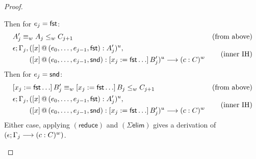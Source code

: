 \documentclass[twoside]{report}
\begin{document}
\begin{proof}
\begin{itemize}
\begin{itemize}
                        Then for $e_j = \operatorname{\mathsf{fst}}$:
                        $$
                            \begin{aligned}
                                                                                                                                                                 & A_j' \equiv_w A_j \leq_w C_{j+1} & \text{(from above)} \\
                                                                                                                                                                 &
                                \begin{aligned}
                                    \epsilon; \Gamma_j,\, & ({[x]}\,@\,({e_0, \ldots, e_{j-1}, \operatorname{\mathsf{fst}}}) : A_j')^u,                                              \\
                                                          & ({[x]}\,@\,({e_0, \ldots, e_{j-1}, \operatorname{\mathsf{snd}}}) : [{x_j}:={\operatorname{\mathsf{fst}} \ldots}]\,{B_j'})^u \longrightarrow (c : C)^w \\
                                \end{aligned} & \text{(inner IH)}                                                             \\
                            \end{aligned}
                        $$
                        Then for $e_j = \operatorname{\mathsf{snd}}$:
                        $$
                            \begin{aligned}
                                                                                                                                                                 & [{x_j}:={\operatorname{\mathsf{fst}} \ldots}]\,{B_j'} \equiv_w [{x_j}:={\operatorname{\mathsf{fst}} \ldots}]\,{B_j} \leq_w C_{j+1} & \text{(from above)} \\
                                                                                                                                                                 &
                                \begin{aligned}
                                    \epsilon; \Gamma_j,\, & ({[x]}\,@\,({e_0, \ldots, e_{j-1}, \operatorname{\mathsf{fst}}}) : A_j')^u,                                              \\
                                                          & ({[x]}\,@\,({e_0, \ldots, e_{j-1}, \operatorname{\mathsf{snd}}}) : [{x_j}:={\operatorname{\mathsf{fst}} \ldots}]\,{B_j'})^u \longrightarrow (c : C)^w \\
                                \end{aligned} & \text{(inner IH)}                                                                                                                     \\
                            \end{aligned}
                        $$
                        Either case, applying $(\mathsf{reduce})$ and $(\Sigma\mathsf{elim})$ gives a derivation of $(\epsilon; \Gamma_j \longrightarrow (c : C)^w)$.
              \end{itemize}


\end{itemize}
\end{proof}
\end{document}
